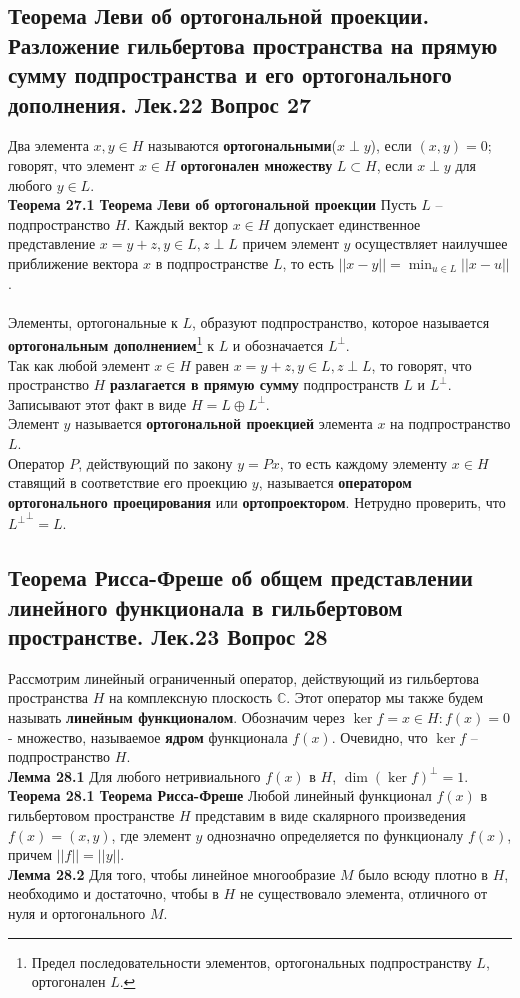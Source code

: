 \documentclass{article}
\begin{document}
\subsection{Теорема Леви об ортогональной проекции. Разложение гильбертова пространства на прямую сумму подпространства и его ортогонального дополнения. Лек.22 \textbf{Вопрос 27}}
	Два элемента $x,y\in H$ называются \textbf{ортогональными}($x\perp y$), если $(x,y)=0$; говорят, что элемент $x\in H$ \textbf{ортогонален множеству} $L\subset H$, если $x\perp y$ для любого $y\in L$.\\
	\textbf{Теорема 27.1 Теорема Леви об ортогональной проекции} Пусть $L$ – подпространство $H$. Каждый вектор $x\in H$ допускает единственное представление $x=y+z,y\in L,z\perp L$ причем элемент
	$y$ осуществляет наилучшее приближение вектора $x$ в подпространстве $L$, то есть $||x-y||=\min_{u\in L}||x-u||$.\\
	\\
	Элементы, ортогональные к $L$, образуют подпространство, которое называется \textbf{ортогональным дополнением}\footnote{Предел последовательности элементов, ортогональных подпространству $L$, ортогонален $L$.} к $L$ и обозначается ${L}^{\perp}$.\\
	Так как любой элемент $x\in H$ равен $x=y+z,y\in L,z\perp L$, то говорят, что пространство $H$ \textbf{разлагается в прямую сумму} подпространств $L$ и ${L}^{\perp}$. Записывают этот факт в виде $H=L\oplus {L}^{\perp}$. \\
	Элемент $y$ называется \textbf{ортогональной проекцией} элемента $x$ на подпространство $L$.\\
	Оператор $P$, действующий по закону $y = Px$, то есть каждому элементу $x\in H$ ставящий в соответствие его проекцию $y$, называется \textbf{оператором ортогонального проецирования} или \textbf{ортопроектором}. Нетрудно проверить, что ${{L}^{\perp}}^{\perp}=L$.\\
\subsection{Теорема Рисса-Фреше об общем представлении линейного функционала в гильбертовом пространстве. Лек.23 \textbf{Вопрос 28}}
	Рассмотрим линейный ограниченный оператор, действующий из
	гильбертова пространства $H$ на комплексную плоскость $\mathbb{C}$. Этот оператор мы также будем называть \textbf{линейным функционалом}. Обозначим через $\ker f={x\in H: f(x)=0}$ - множество, называемое \textbf{ядром} функционала $f(x)$. Очевидно, что $\ker f$ – подпространство $H$.\\
	\textbf{Лемма 28.1} Для любого нетривиального $f(x)$ в $H$, $\dim{(\ker f)}^{\perp}=1$.\\
	\textbf{Теорема 28.1 Теорема Рисса-Фреше} Любой линейный функционал $f(x)$ в гильбертовом пространстве $H$ представим в виде скалярного произведения $f(x)=(x,y)$, где элемент $y$ однозначно определяется по функционалу $f(x)$, причем $||f||=||y||$.\\
	\textbf{Лемма 28.2} Для того, чтобы линейное многообразие $M$ было всюду плотно в $H$, необходимо и достаточно, чтобы в $H$ не существовало элемента, отличного от нуля и ортогонального $M$.\\
\end{document}
